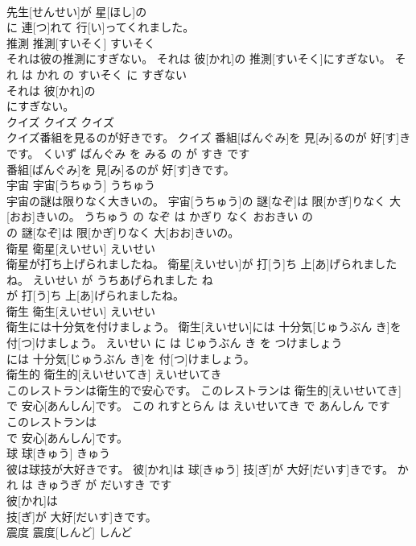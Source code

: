\documentclass[8pt]{extreport}
\begin{document}
\begin{CJK}{UTF8}{min}
\\	先生[せんせい]が 星[ほし]の
\\	に 連[つ]れて 行[い]ってくれました。			
\\	推測	推測[すいそく]	すいそく	
\\	それは彼の推測にすぎない。	それは 彼[かれ]の 推測[すいそく]にすぎない。	それ は かれ の すいそく に すぎない	
\\	それは 彼[かれ]の
\\	にすぎない。			
\\	クイズ	クイズ	クイズ	
\\	クイズ番組を見るのが好きです。	クイズ 番組[ばんぐみ]を 見[み]るのが 好[す]きです。	くいず ばんぐみ を みる の が すき です	
\\	番組[ばんぐみ]を 見[み]るのが 好[す]きです。			
\\	宇宙	宇宙[うちゅう]	うちゅう	
\\	宇宙の謎は限りなく大きいの。	宇宙[うちゅう]の 謎[なぞ]は 限[かぎ]りなく 大[おお]きいの。	うちゅう の なぞ は かぎり なく おおきい の	
\\	の 謎[なぞ]は 限[かぎ]りなく 大[おお]きいの。			
\\	衛星	衛星[えいせい]	えいせい	
\\	衛星が打ち上げられましたね。	衛星[えいせい]が 打[う]ち 上[あ]げられましたね。	えいせい が うちあげられました ね	
\\	が 打[う]ち 上[あ]げられましたね。			
\\	衛生	衛生[えいせい]	えいせい	
\\	衛生には十分気を付けましょう。	衛生[えいせい]には 十分気[じゅうぶん き]を 付[つ]けましょう。	えいせい に は じゅうぶん き を つけましょう	
\\	には 十分気[じゅうぶん き]を 付[つ]けましょう。			
\\	衛生的	衛生的[えいせいてき]	えいせいてき	
\\	このレストランは衛生的で安心です。	このレストランは 衛生的[えいせいてき]で 安心[あんしん]です。	この れすとらん は えいせいてき で あんしん です	
\\	このレストランは
\\	で 安心[あんしん]です。			
\\	球	球[きゅう]	きゅう	
\\	彼は球技が大好きです。	彼[かれ]は 球[きゅう] 技[ぎ]が 大好[だいす]きです。	かれ は きゅうぎ が だいすき です	
\\	彼[かれ]は
\\	技[ぎ]が 大好[だいす]きです。			
\\	震度	震度[しんど]	しんど	

\end{CJK}
\end{document}
